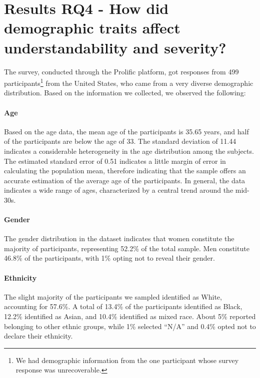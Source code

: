 \section{Results RQ4 - How did demographic traits affect understandability and severity?
}
\label{secRQ4}

The survey, conducted through the Prolific platform, got responses from 499 participants\footnote{We had demographic information from the one participant whose survey response was unrecoverable.} from the United States, who came from a very diverse demographic distribution.
Based on the information we collected, we observed the following:

\paragraph{Age} 
Based on the age data, the mean age of the participants is 35.65 years, and half of the participants are below the age of 33.
The standard deviation of 11.44 indicates a considerable heterogeneity in the age distribution among the subjects.
The estimated standard error of 0.51 indicates a little margin of error in calculating the population mean, therefore indicating that the sample offers an accurate estimation of the average age of the participants.
In general, the data indicates a wide range of ages, characterized by a central trend around the mid-30s.

\paragraph{Gender}
The gender distribution in the dataset indicates that women constitute the majority of participants, representing 52.2\% of the total sample. 
Men constitute 46.8\% of the participants, with 1\% opting not to reveal their gender.

\paragraph{Ethnicity}
The slight majority of the participants we sampled identified as White, accounting for 57.6\%.
A total of 13.4\% of the participants identified as Black, 12.2\% identified as Asian, and 10.4\% identified as mixed race.
About 5\% reported belonging to other ethnic groups, while 1\% selected ``N/A'' and 0.4\% opted not to declare their ethnicity.

